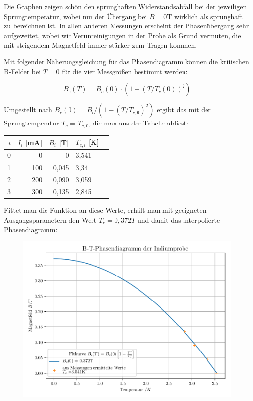 Die Graphen zeigen schön den sprunghaften Widerstandsabfall bei der jeweiligen Sprungtemperatur, wobei nur der Übergang bei $B=0$T wirklich als sprunghaft zu bezeichnen ist. In allen anderen Messungen erscheint der Phasenübergang sehr aufgeweitet, wobei wir Verunreinigungen in der Probe als Grund vermuten, die mit steigendem Magnetfeld immer stärker zum Tragen kommen. 


Mit folgender Näherungsgleichung für das Phasendiagramm können die kritischen B-Felder bei $T=0$ für die vier Messgrößen bestimmt werden:

\begin{equation}
B_c(T) = B_c(0) \cdot \left( 1 - \left( T / T_c(0) \right)^2 \right)
\end{equation}

Umgestellt nach $B_c(0) = B_i / (1 - (T / T_{c,0})^2 )$ ergibt das mit der Sprungtemperatur $T_c$ = $T_{c,0}$, die man aus der Tabelle abliest:

\begin{table}[h]
\center\begin{tabular}[h]{|r|r|r|l|l|}
\hline
$i$ & $I_i$ [mA] &  $B_i$ [T] & $T_{c,i}$ [K] \\
\hline
0 &   0 &       0 & 3,541 \\
1 & 100 &  0,045 & 3,34 \\
2 & 200 &  0,090 & 3,059 \\
3 & 300 & 0,135 & 2,845 \\
\hline
\end{tabular}
\end{table}

Fittet man die Funktion an diese Werte, erhält man mit geeigneten Ausgangsparametern den Wert $T_c = 0,372 T$ und damit das interpolierte Phasendiagramm:

\begin{figure}[h]
\includegraphics[width=\textwidth]{B-T-Phasendiagramm_der_Indiumprobe.pdf}
\end{figure}

